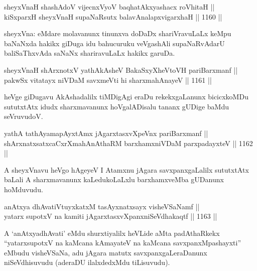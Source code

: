 
\begin{shl}
sheyxVnaH shashAdoV vijecnxVyoV baqhatAkxyashacx roVhitaH || \\
kiSxparxH sheyxVnaH supaNaRsutx balavAnalapxvigarxhaH \hfill || 1160 ||  
\end{shl}

\begin{artha}
sheyxVna: eMdare molavanunx tinunxva doDaDx shariVravuLaLx keMpu baNaNxda hakikx giDuga idu bahucuruku veVgashAli supaNaRvAdarU baliSaThxvAda saNaNx shariravuLaLx hakikx garuDa.
\end{artha}

\begin{shl}
sheyxVnaH shArxnotxV yathA\s \s kAsheV BakaSxyXheVtoVH pariBarxmanf || \\
pakwSx vitatayx niVDaM savxmeVti hi sharxmahAnayeV \hfill || 1161 || 
\end{shl}

\begin{artha}
heVge giDugavu AkAshadalilx tiMDigAgi eraDu rekekxgaLanunx bicicxkoMDu sututxtAtx idudx sharxmavanunx hoVgalADisalu tananx gUDige baMdu seVruvudoV.
\end{artha}

\begin{shl}
yathA tathA\s yamapAyxtAmx jAgarxtasxvXpeVnx pariBarxmanf || \\
shArxnatxsatxcaCxrXmahAnAthaRM barxhamxniVDaM parxpadayxteV \hfill || 1162 ||  
\end{shl}

\begin{artha}
A sheyxVnavu heVgo hAgeyeV I Atamxnu jAgara savxpanxgaLalilx sututxtAtx baLali A sharxmavanunx kaLedukoLaLxlu barxhamxveMba gUDanunx hoMduvudu.
\end{artha}


\begin{shl}
anAtxya dhAvatiVtuyxkatxM tasAyxnatxsayx visheVSaNamf || \\
yatarx supotxV na kamiti jAgarxtasxvXpanxniSeVdhakaqtf \hfill || 1163 ||  
\end{shl}

\begin{artha}
A `anAtxyadhAvati' eMdu shurxtiyalilx heVLide aMta padAthaRkekx ``yatarxsupotxV na kaMcana kAmayateV na kaMcana savxpanxMpashayxti'' eMbudu visheVSaNa, adu jAgara matutx savxpanxgaLeraDanunx niSeVdhisuvudu (aderaDU ilalxdedxMdu tiLisuvudu).
\end{artha}

